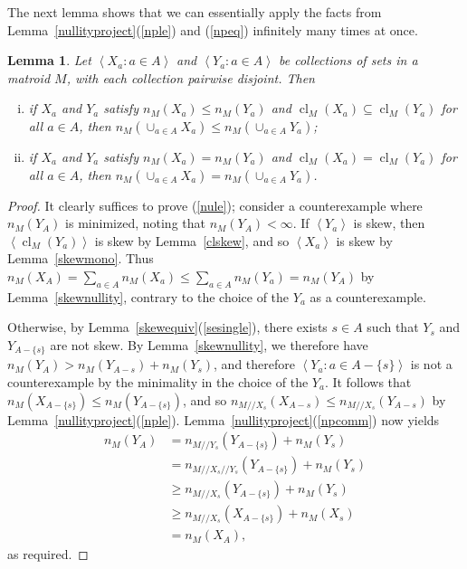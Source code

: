 \documentclass{amsart}
\theoremstyle{plain}
\newtheorem{lemma}[theorem]{Lemma}
\theoremstyle{definition}
\newcommand{\dcon}{/ \!\! /}
\DeclareMathOperator{\cl}{cl}
\newcommand{\ab}[1]{\left\langle#1\right\rangle}
\renewcommand{\le}{\leqslant}
\renewcommand{\ge}{\geqslant}
\renewcommand{\ss}{\subseteq}
\begin{document}
The next lemma shows that we can essentially apply the facts from Lemma~\ref{nullityproject}(\ref{nple}) and (\ref{npeq})
infinitely many times at once. 

\begin{lemma}\label{nullityunion}
  Let $\ab{X_a : a \in A}$ and $\ab{Y_a : a \in A}$ be collections of 
  sets in a matroid $M$, with each collection pairwise disjoint. Then
  \begin{enumerate}[(i)]
    \item\label{nule} if $X_a$ and $Y_a$ satisfy $n_M(X_a) \le n_M(Y_a)$ and $\cl_M(X_a) \ss \cl_M(Y_a)$ for all $a \in A$,
    then $n_M(\cup_{a \in A} X_a) \le n_M(\cup_{a \in A} Y_a)$;
    \item\label{nueq} if $X_a$ and $Y_a$ satisfy $n_M(X_a) = n_M(Y_a)$ and $\cl_M(X_a) = \cl_M(Y_a)$ for all $a \in A$,
    then $n_M(\cup_{a \in A} X_a) = n_M(\cup_{a \in A} Y_a)$.
  \end{enumerate} 
\end{lemma}
\begin{proof}
  It clearly suffices to prove (\ref{nule});
  consider a counterexample where $n_M(Y_A)$ is minimized, noting that $n_M(Y_A) < \infty$. 
  If $\ab{Y_a}$ is skew, then $\ab{\cl_M(Y_a)}$ is skew by Lemma~\ref{clskew}, 
  and so $\ab{X_a}$ is skew by Lemma~\ref{skewmono}. Thus
  $n_M(X_A) = \sum_{a \in A}n_M(X_a) \le \sum_{a \in A} n_M(Y_a) = n_M(Y_A)$ 
  by Lemma~\ref{skewnullity}, contrary to the choice of the $Y_a$ 
  as a counterexample.

  Otherwise, by Lemma~\ref{skewequiv}(\ref{sesingle}), there exists $s \in A$
  such that $Y_s$ and $Y_{A - \{s\}}$ are not skew. 
  By Lemma~\ref{skewnullity}, we therefore have $n_M(Y_A) > n_M(Y_{A-s}) + n_M(Y_s)$,
  and therefore  $\ab{Y_a : a \in A - \{s\}}$ is not 
  a counterexample by the minimality in the choice of the $Y_a$. 
  It follows that $n_M(X_{A-\{s\}}) \le n_M(Y_{A - \{s\}})$,
  and so $n_{M \dcon X_s}(X_{A-s}) \le n_{M \dcon X_s}(Y_{A-s})$ by 
  Lemma~\ref{nullityproject}(\ref{nple}). 
  Lemma~\ref{nullityproject}(\ref{npcomm}) now yields
  \begin{align*}
    n_M(Y_A) &= n_{M \dcon Y_s}(Y_{A-\{s\}}) + n_M(Y_s) \\
    &= n_{M \dcon X_s \dcon Y_s}(Y_{A - \{s\}}) + n_M(Y_s) \\
    &\ge n_{M \dcon X_s}(Y_{A - \{s\}}) + n_M(Y_s) \\ 
    &\ge n_{M \dcon X_s}(X_{A - \{s\}}) + n_M(X_s) \\ 
    &= n_M(X_A),
  \end{align*}
  as required. 
\end{proof}
\end{document}
